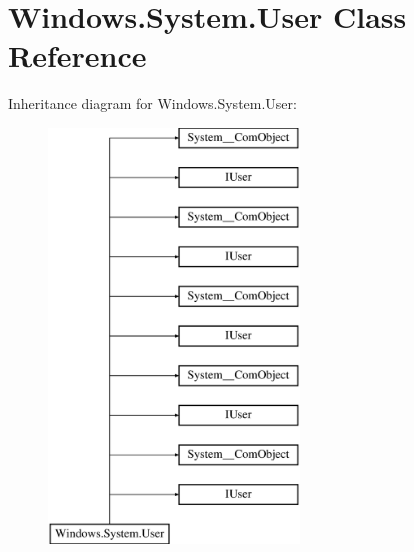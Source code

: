 \hypertarget{class_windows_1_1_system_1_1_user}{}\section{Windows.\+System.\+User Class Reference}
\label{class_windows_1_1_system_1_1_user}
Inheritance diagram for Windows.\+System.\+User\+:\begin{figure}[H]
\begin{center}
\leavevmode
\includegraphics[height=11.000000cm]{class_windows_1_1_system_1_1_user}
\end{center}
\end{figure}
